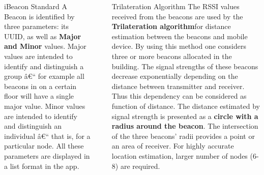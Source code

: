 \documentclass[final]{beamer}
\newlength{\sepwid}
\newlength{\onecolwid}
\newlength{\twocolwid}
\begin{document}
\begin{frame}[t]
\begin{columns}[t]
\begin{column}{\twocolwid}
\begin{columns}[t,totalwidth=\twocolwid]
\begin{column}{\onecolwid}
\begin{block}{ iBeacon Standard}
A Beacon is identified by three parameters: its UUID, as well as \textbf{ Major and Minor} values.
Major values are intended to identify and distinguish a group â€“ for example all beacons in on a certain floor will have a single major value.
Minor values are intended to identify and distinguish an individual â€“ that is, for a particular node.
All these parameters are displayed in a list format in the app.

\end{block}


\end{column} %

\end{columns} %

\end{column} %

\begin{column}{\sepwid}\end{column} %

\begin{column}{\onecolwid} %


\begin{block}{Trilateration Algorithm}
  The RSSI values received from the beacons are used by the \textbf {Trilateration algorithm}for distance estimation between the beacons and mobile device. By using this method one considers three or more beacons allocated in the building. The signal strengths of these beacons decrease exponentially depending on the distance between transmitter and receiver. Thus this dependency can be considered as function of distance. The distance estimated by signal strength is presented as a \textbf{circle with a radius around the beacon}. The intersection of the three beacons' radii provides a point or an area of receiver. For highly accurate location estimation, larger number of nodes (6-8) are required.

\end{block}




\end{column}
\end{columns}
\end{frame}
\end{document}
